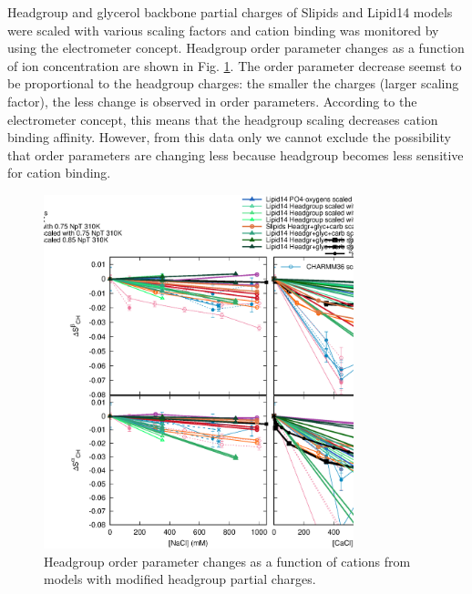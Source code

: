 \documentclass[aps,prl,superscriptaddress,twocolumn]{revtex4}
\begin{document}
Headgroup and glycerol backbone partial charges of Slipids and Lipid14 models were scaled
with various scaling factors and cation binding was monitored by using the electrometer
concept. Headgroup order parameter changes as a function of ion concentration are
shown in Fig. \ref{OrderParameterIONSchangesSCALED}. The order parameter decrease
seemst to be proportional to the headgroup charges: the smaller the charges
(larger scaling factor), the less change is observed in order parameters.
According to the electrometer concept, this means that the headgroup scaling
decreases cation binding affinity. However, from this data only we cannot
exclude the possibility that order parameters are changing less because
headgroup becomes less sensitive for cation binding.
\begin{figure}[]
  \centering
  \includegraphics[width=9.0cm]{../Fig/OrderParameterIONSchangesSCALED.eps}
  \caption{\label{OrderParameterIONSchangesSCALED}
    Headgroup order parameter changes as a function of cations from models
    with modified headgroup partial charges.}
\end{figure}
\end{document}
